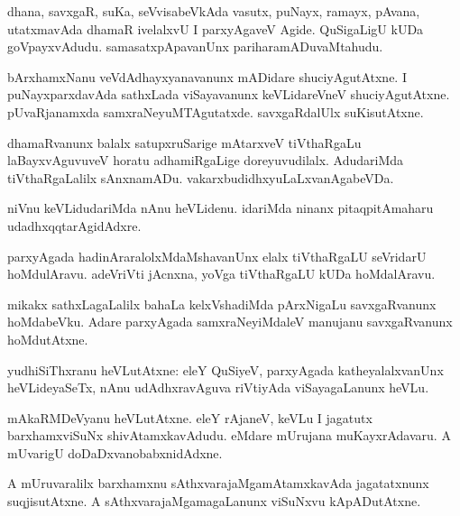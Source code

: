 \documentclass{article}
\begin{document}
\begin{mn}
dhana, savxgaR, suKa, seVvisabeVkAda vasutx, puNayx, ramayx, pAvana, utatxmavAda dhamaR ivelalxvU 
I parxyAgaveV Agide. QuSigaLigU kUDa goVpayxvAdudu. samasatxpApavanUnx pariharamADuvaMtahudu. 
\end{mn}

\begin{mn}
bArxhamxNanu veVdAdhayxyanavanunx mADidare shuciyAgutAtxne. I puNayxparxdavAda sathxLada 
viSayavanunx keVLidareVneV shuciyAgutAtxne. pUvaRjanamxda samxraNeyuMTAgutatxde. savxgaRdalUlx 
suKisutAtxne.
\end{mn}

\begin{mn}
dhamaRvanunx balalx satupxruSarige mAtarxveV tiVthaRgaLu laBayxvAguvuveV horatu adhamiRgaLige 
doreyuvudilalx. AdudariMda tiVthaRgaLalilx sAnxnamADu. vakarxbudidhxyuLaLxvanAgabeVDa.
\end{mn}

\begin{mn}
niVnu keVLidudariMda nAnu heVLidenu. idariMda ninanx pitaqpitAmaharu udadhxqqtarAgidAdxre.
\end{mn}

\begin{mn}
parxyAgada hadinAraralolxMdaMshavanUnx elalx tiVthaRgaLU seVridarU hoMdulAravu. adeVriVti 
jAcnxna, yoVga tiVthaRgaLU kUDa hoMdalAravu.
\end{mn}

\begin{mn}
mikakx sathxLagaLalilx bahaLa kelxVshadiMda pArxNigaLu savxgaRvanunx hoMdabeVku. Adare parxyAgada 
samxraNeyiMdaleV manujanu savxgaRvanunx hoMdutAtxne.
\end{mn}


\begin{mn}
yudhiSiThxranu heVLutAtxne: eleY QuSiyeV, parxyAgada katheyalalxvanUnx heVLideyaSeTx, nAnu 
udAdhxravAguva riVtiyAda viSayagaLanunx heVLu.
\end{mn}

\begin{mn}
mAkaRMDeVyanu heVLutAtxne. eleY rAjaneV, keVLu I jagatutx barxhamxviSuNx shivAtamxkavAdudu. 
eMdare mUrujana muKayxrAdavaru. A mUvarigU doDaDxvanobabxnidAdxne.
\end{mn}

\begin{mn}
A mUruvaralilx barxhamxnu sAthxvarajaMgamAtamxkavAda jagatatxnunx suqjisutAtxne. A 
sAthxvarajaMgamagaLanunx viSuNxvu kApADutAtxne.
\end{mn}
\end{document}

